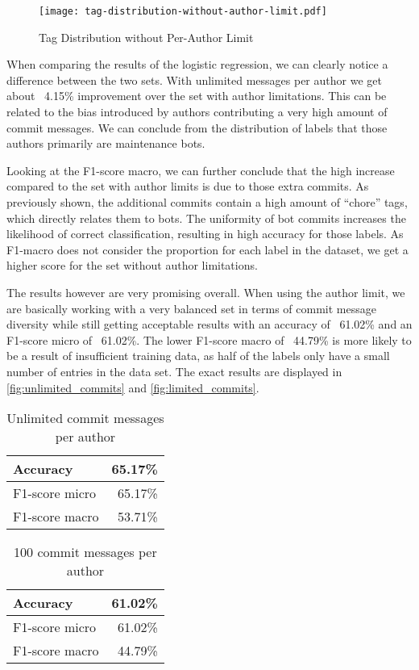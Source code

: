 \begin{figure}[H]
  \centering
  \texttt{[image: tag-distribution-without-author-limit.pdf]}
  \caption{Tag Distribution without Per-Author Limit}
  \label{fig:tag_dist_without_limit}
\end{figure}

When comparing the results of the logistic regression, we can clearly notice a difference between the two sets.
With unlimited messages per author we get about ~4.15\% improvement over the set with author limitations. This
can be related to the bias introduced by authors contributing a very high amount of commit messages. We can
conclude from the distribution of labels that those authors primarily are maintenance bots.

Looking at the F1-score macro, we can further conclude that the high increase compared to the set with author
limits is due to those extra commits. As previously shown, the additional commits contain a high amount of
“chore” tags, which directly relates them to bots. The uniformity of bot commits increases the likelihood
of correct classification, resulting in high accuracy for those labels. As F1-macro does not consider the
proportion for each label in the dataset, we get a higher score for the set without author limitations.

The results however are very promising overall. When using the author limit, we are basically working with a
very balanced set in terms of commit message diversity while still getting acceptable results with an accuracy
of ~61.02\% and an F1-score micro of ~61.02\%. The lower F1-score macro of ~44.79\% is more likely to be a
result of insufficient training data, as half of the labels only have a small number of entries in the data set.
The exact results are displayed in \autoref{fig:unlimited_commits} and \autoref{fig:limited_commits}.

\begin{table}[H]
  \def\arraystretch{1.15}%
  \centering
  \begin{tabular}{|l|r|}
    \hline
    Accuracy       & 65.17\% \\
    \hline
    F1-score micro & 65.17\% \\
    \hline
    F1-score macro & 53.71\% \\
    \hline
  \end{tabular}
  \caption{Unlimited commit messages per author}
  \label{fig:unlimited_commits}
\end{table}

\begin{table}[H]
  \def\arraystretch{1.15}%
  \centering
  \begin{tabular}{|l|r|}
    \hline
    Accuracy       & 61.02\% \\
    \hline
    F1-score micro & 61.02\% \\
    \hline
    F1-score macro & 44.79\% \\
    \hline
  \end{tabular}
  \caption{100 commit messages per author}
  \label{fig:limited_commits}
\end{table}

